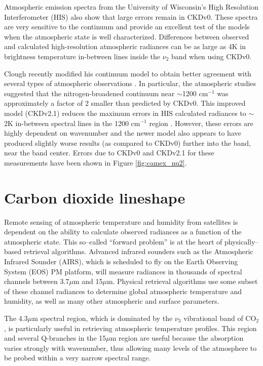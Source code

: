 \documentclass[11pt]{article}
\begin{document}
Atmospheric emission spectra from the University of Wisconsin's High 
Resolution Interferometer (HIS)\cite{the:94,smi:90,clo:88} also show 
that large errors remain in CKDv0.  These spectra are 
very sensitive to the continuum and provide an excellent test of 
the models when the atmospheric state is well characterized.  
Differences between observed and calculated high-resolution atmospheric 
radiances can be as large as 4K in brightness temperature in-between lines 
inside the $\nu_{2}$ band when using CKDv0\cite{the:94,rev:90,rev:89}.

Clough recently modified his continuum model to obtain better 
agreement with several types of atmospheric observations
\cite{clo:95,the:94,clo:88}.  In particular, the atmospheric studies
suggested that the nitrogen-broadened continuum near $\sim$1200 cm$^{-1}$
was approximately a factor of 2 smaller 
than predicted by CKDv0.  This improved model (CKDv2.1) reduces the maximum 
errors in HIS calculated radiances to $\sim$2K in-between spectral lines in 
the 1200 cm$^{-1}$ region \cite{str:95}.  However, these errors are highly 
dependent on wavenumber and the newer model also appears to have
produced slightly worse results (as compared to CKDv0) further into the 
band, near the band center.  Errors due to CKDv0 and CKDv2.1 for these 
measurements have been shown in Figure \ref{fig:camex_nu2}.

\section{Carbon dioxide lineshape}
Remote sensing of atmospheric temperature and humidity from satellites is
dependent on the ability to calculate observed radiances as a
function of the atmospheric state.  This so--called ``forward problem'' is 
at the heart of physically--based retrieval algorithms.  Advanced infrared
sounders such as the Atmospheric Infrared Sounder (AIRS)\cite{air:91},
which is scheduled to fly on the Earth Observing System (EOS) PM platform, 
will measure radiances in thousands of spectral channels between 3.7$\mu$m 
and 15$\mu$m.  Physical retrieval algorithms use
some subset of these channel radiances to determine global atmospheric
temperature and humidity, as well as many other atmospheric and surface
parameters.

The 4.3$\mu$m spectral region, which is dominated by the $\nu_3$
vibrational band of CO$_2$, is particularly useful in retrieving atmospheric
temperature profiles.  This region and several Q-branches in the 15$\mu$m
region are useful because the absorption varies strongly with wavenumber, 
thus allowing many levels of the atmosphere to be probed within a very
narrow spectral range.  
\end{document}
